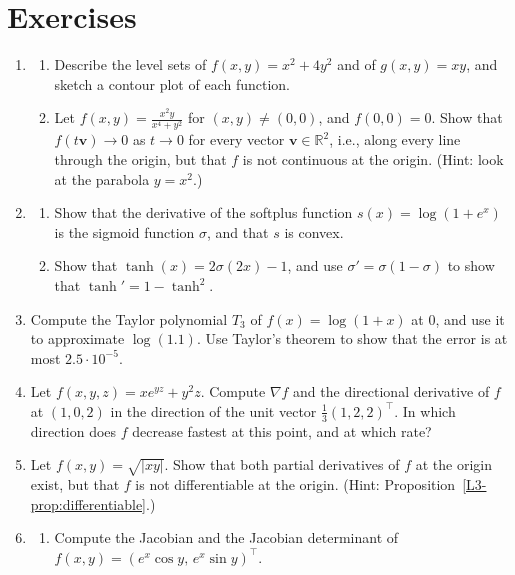 \section{Exercises}\label{L3-sec:exercises}
\begin{enumerate}[leftmargin=*]
    \item\label{L3-ex3:level-sets} \begin{enumerate}[label=(\alph*)]
        \item Describe the level sets of $f(x, y) = x^2 + 4y^2$ and of $g(x, y) = xy$, and sketch a contour plot of each function.
        \item Let $f(x, y) = \frac{x^2 y}{x^4 + y^2}$ for $(x, y) \neq (0, 0)$, and $f(0, 0) = 0$. Show that $f(t\mathbf{v}) \to 0$ as $t \to 0$ for every vector $\mathbf{v} \in \mathbb{R}^2$, i.e., along every line through the origin, but that $f$ is not continuous at the origin. (Hint: look at the parabola $y = x^2$.)
    \end{enumerate}
    \item \begin{enumerate}[label=(\alph*)]
        \item Show that the derivative of the softplus function $s(x) = \log(1 + e^x)$ is the sigmoid function $\sigma$, and that $s$ is convex.
        \item Show that $\tanh(x) = 2\sigma(2x) - 1$, and use $\sigma' = \sigma(1 - \sigma)$ to show that $\tanh' = 1 - \tanh^2$.
    \end{enumerate}
    \item Compute the Taylor polynomial $T_3$ of $f(x) = \log(1 + x)$ at $0$, and use it to approximate $\log(1.1)$. Use Taylor's theorem to show that the error is at most $2.5 \cdot 10^{-5}$.
    \item \homework{} Let $f(x, y, z) = x e^{yz} + y^2 z$. Compute $\nabla f$ and the directional derivative of $f$ at $(1, 0, 2)$ in the direction of the unit vector $\frac{1}{3}(1, 2, 2)^\top$. In which direction does $f$ decrease fastest at this point, and at which rate?
    \item Let $f(x, y) = \sqrt{|xy|}$. Show that both partial derivatives of $f$ at the origin exist, but that $f$ is not differentiable at the origin. (Hint: Proposition~\ref{L3-prop:differentiable}.)
    \item \begin{enumerate}[label=(\alph*)]
        \item Compute the Jacobian and the Jacobian determinant of $f(x, y) = (e^x\cos y, \, e^x\sin y)^\top$.

\end{enumerate}
\end{enumerate}
